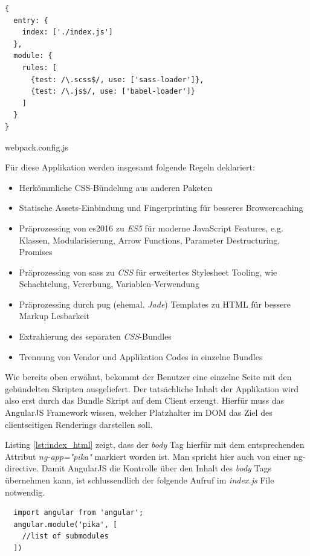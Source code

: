 \begin{listing}[H]
\begin{verbatim}
{
  entry: {
    index: ['./index.js']
  },
  module: {
    rules: [
      {test: /\.scss$/, use: ['sass-loader']},
      {test: /\.js$/, use: ['babel-loader']}
    ]
  }
}
\end{verbatim}
\caption{webpack.config.js}
\label{lst:webpack_config}
\end{listing}

Für diese Applikation werden insgesamt folgende Regeln deklariert:

\begin{itemize}
 \item Herkömmliche CSS-Bündelung aus anderen Paketen
 \item Statische Assets-Einbindung und Fingerprinting für besseres Browsercaching
 \item Präprozessing von \gls{es2016} zu \textit{ES5} für moderne JavaScript Features, e.g. Klassen, Modularisierung, Arrow Functions, Parameter Destructuring, Promises
 \item Präprozessing von \gls{sass} zu \textit{CSS} für erweitertes Stylesheet Tooling, wie Schachtelung, Vererbung, Variablen-Verwendung
 \item Präprozessing durch \gls{pug} (ehemal. \textit{Jade}) Templates zu HTML für bessere Markup Lesbarkeit
 \item Extrahierung des separaten \textit{CSS}-Bundles
 \item Trennung von Vendor und Applikation Codes in einzelne Bundles
\end{itemize}

Wie bereits oben erwähnt, bekommt der Benutzer eine einzelne Seite mit den gebündelten Skripten ausgeliefert. Der tatsächliche Inhalt der Applikation wird also erst durch das Bundle Skript auf dem Client erzeugt. Hierfür muss das AngularJS Framework wissen, welcher Platzhalter im DOM das Ziel des clientseitigen Renderings darstellen soll.

Listing \ref{lst:index_html} zeigt, dass der \textit{body} Tag hierfür mit dem entsprechenden Attribut \textit{ng-app="pika"} markiert worden ist. Man spricht hier auch von einer \gls{ng-directive}. Damit AngularJS die Kontrolle über den Inhalt des \textit{body} Tags übernehmen kann, ist schlussendlich der folgende Aufruf im \textit{index.js} File notwendig.

\begin{listing}[H]
\begin{verbatim}
  import angular from 'angular';
  angular.module('pika', [
    //list of submodules
  ])
\end{verbatim}
\end{listing}

